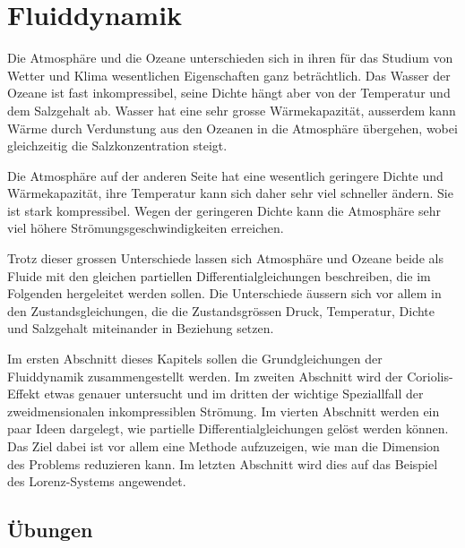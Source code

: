 %
%
%
\chapter{Fluiddynamik\label{chapter:fluiddynamik}}
\rhead{}
Die Atmosphäre und die Ozeane unterschieden sich in ihren
für das Studium von Wetter und Klima wesentlichen Eigenschaften
ganz beträchtlich.
Das Wasser der Ozeane ist fast inkompressibel, seine Dichte hängt aber
von der Temperatur und dem Salzgehalt ab.
Wasser hat eine sehr grosse Wärmekapazität, ausserdem kann Wärme durch
Verdunstung aus den Ozeanen in die Atmosphäre übergehen, wobei gleichzeitig
die Salzkonzentration steigt.

Die Atmosphäre auf der anderen Seite hat eine wesentlich geringere
Dichte und Wärmekapazität, ihre Temperatur kann sich daher sehr viel
schneller ändern.
Sie ist stark kompressibel.
Wegen der geringeren Dichte kann die Atmosphäre sehr viel höhere
Strömungsgeschwindigkeiten erreichen.

Trotz dieser grossen Unterschiede lassen sich Atmosphäre und Ozeane
beide als Fluide mit den gleichen partiellen Differentialgleichungen
beschreiben, die im Folgenden hergeleitet werden sollen.
Die Unterschiede äussern sich vor allem in den Zustandsgleichungen,
die die Zustandsgrössen Druck, Temperatur, Dichte und Salzgehalt
miteinander in Beziehung setzen.

Im ersten Abschnitt dieses Kapitels sollen die Grundgleichungen
der Fluiddynamik zusammengestellt werden.
Im zweiten Abschnitt wird der Coriolis-Effekt etwas genauer 
untersucht und im dritten der wichtige Speziallfall der 
zweidmensionalen inkompressiblen Strömung.
Im vierten Abschnitt werden ein paar Ideen dargelegt, wie partielle
Differentialgleichungen gelöst werden können.
Das Ziel dabei ist vor allem eine Methode aufzuzeigen, wie man die
Dimension des Problems reduzieren kann.
Im letzten Abschnitt wird dies auf das Beispiel des Lorenz-Systems angewendet.








\section*{Übungen}
\begin{uebungsaufgaben}
\item

\item

\item

\end{uebungsaufgaben}


